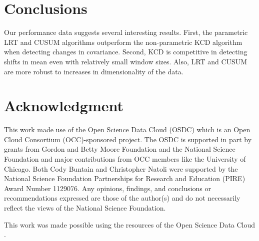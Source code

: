 \documentclass[conference,letterpaper]{IEEEtran}
\begin{document}
\section{Conclusions}

Our performance data suggests several interesting results.
First, the parametric LRT and CUSUM algorithms outperform the non-parametric KCD algorithm when detecting changes in covariance.
Second, KCD is competitive in detecting shifts in mean even with relatively small window sizes.
Also, LRT and CUSUM are more robust to increases in dimensionality of the data.

\section*{Acknowledgment}
This work made use of the Open Science Data Cloud (OSDC) which is an Open
Cloud Consortium (OCC)-sponsored project. The OSDC is supported in part by
grants from Gordon and Betty Moore Foundation and the National Science 
Foundation and major contributions from OCC members like the University of 
Chicago.  Both Cody Buntain and Christopher Natoli were supported by the 
National Science Foundation Partnerships for Research and Education (PIRE) 
Award Number 1129076. Any opinions, findings, and conclusions or 
recommendations expressed are those of the author(s) and do not necessarily 
reflect the views of the National Science Foundation. 

This work was made possible using the resources of the Open Science Data Cloud \cite{Grossman2012}.




\end{document}
